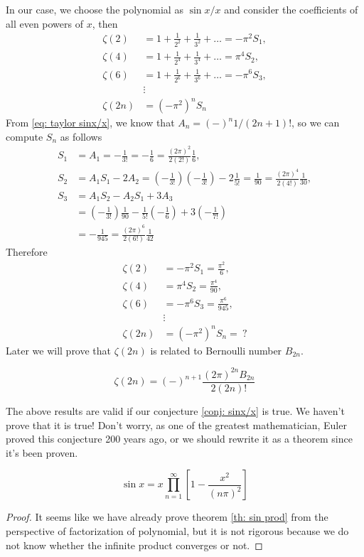 \documentclass[10pt]{article}
\begin{document}
	In our case, we choose the polynomial as $\sin x /x$ and consider the coefficients of all even powers of $x$, then
	\begin{align*}
		\zeta(2) &= 1 + \frac{1}{2^2} + \frac{1}{3^2} + \dots = - \pi^2 S_1, \\
		\zeta(4) &= 1 + \frac{1}{2^4} + \frac{1}{3^4} + \dots = \pi^4 S_2, \\
		\zeta(6) &= 1 + \frac{1}{2^6} + \frac{1}{3^6} + \dots = - \pi^6 S_3, \\
		&\vdots \\
		\zeta(2n) &= (-\pi^2)^n S_n
	\end{align*}
	From \eqref{eq: taylor sinx/x}, we know that $A_n = (-)^n 1/(2n+1)!$, so we can compute $S_n$ as follows
	\begin{align*}
		S_1 &= A_1 = -\frac{1}{3!} = -\frac{1}{6} = \frac{(2\pi)^{2}}{2(2!)} \frac{1}{6}, \\
		S_2 &= A_1 S_1 - 2 A_2 =  \left(-\frac{1}{3!}\right)\left(-\frac{1}{3!}\right) - 2 \frac{1}{5!} = \frac{1}{90} = \frac{(2\pi)^{4}}{2(4!)} \frac{1}{30}, \\
		S_3 &= A_1 S_2 - A_2 S_1 + 3 A_3 \\
		&= \left(-\frac{1}{3!}\right) \frac{1}{90} - \frac{1}{5!} \left(- \frac{1}{6} \right) + 3 \left(-\frac{1}{7!}\right) \\
		&= -\frac{1}{945} = \frac{(2\pi)^{6}}{2(6!)} \frac{1}{42}
	\end{align*}
	Therefore
	\begin{align*}
		\zeta(2) &= - \pi^2 S_1 = \frac{\pi^2}{6}, \\
		\zeta(4) &= \pi^4 S_2 = \frac{\pi^4}{90}, \\
		\zeta(6) &= - \pi^6 S_3 = \frac{\pi^6}{945}, \\
		&\vdots \\
		\zeta(2n) &= (-\pi^2)^n S_n = \ ?
	\end{align*}
	Later we will prove that $\zeta(2n)$ is related to Bernoulli number $B_{2n}$.
	\begin{theorem}
		\begin{equation}
			\zeta(2n) = (-)^{n+1} \frac{(2\pi)^{2n} B_{2n}}{2(2n)!}
		\end{equation}
	\end{theorem}
	The above results are valid if our conjecture \eqref{conj: sinx/x} is true. We haven't prove that it is true! Don't worry, as one of the greatest mathematician, Euler proved this conjecture 200 years ago, or we should rewrite it as a theorem since it's been proven.
	\begin{theorem} \label{th: sin prod}
		\begin{equation}
			\sin x = x \prod_{n=1}^{\infty} \left[ 1 - \frac{x^2}{(n\pi)^2} \right]
		\end{equation}
	\end{theorem}
	\begin{proof}
		It seems like we have already prove theorem \ref{th: sin prod} from the perspective of factorization of polynomial, but it is not rigorous because we do not know whether the infinite product converges or not.
	\end{proof}
\end{document}
